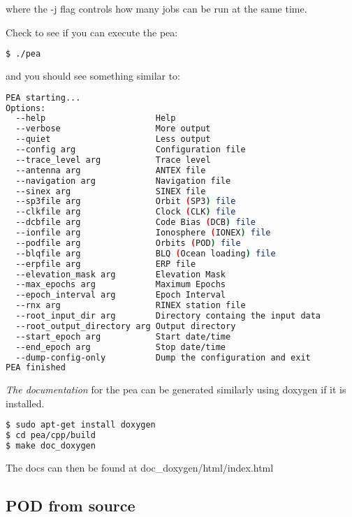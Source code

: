 where the -j flag controls how many jobs can be run at the same time.

Check to see if you can execute the pea:
\begin{lstlisting}[language=bash]
$ ./pea    
\end{lstlisting}

and you should see something similar to:
\begin{lstlisting}[language=bash]
PEA starting...
Options:
  --help                      Help
  --verbose                   More output
  --quiet                     Less output
  --config arg                Configuration file
  --trace_level arg           Trace level
  --antenna arg               ANTEX file
  --navigation arg            Navigation file
  --sinex arg                 SINEX file
  --sp3file arg               Orbit (SP3) file
  --clkfile arg               Clock (CLK) file
  --dcbfile arg               Code Bias (DCB) file
  --ionfile arg               Ionosphere (IONEX) file
  --podfile arg               Orbits (POD) file
  --blqfile arg               BLQ (Ocean loading) file
  --erpfile arg               ERP file
  --elevation_mask arg        Elevation Mask
  --max_epochs arg            Maximum Epochs
  --epoch_interval arg        Epoch Interval
  --rnx arg                   RINEX station file
  --root_input_dir arg        Directory containg the input data
  --root_output_directory arg Output directory
  --start_epoch arg           Start date/time
  --end_epoch arg             Stop date/time
  --dump-config-only          Dump the configuration and exit
PEA finished
\end{lstlisting}

\textit{The documentation} for the pea can be generated similarly using doxygen if it is installed.

\begin{lstlisting}[language=bash]
$ sudo apt-get install doxygen
$ cd pea/cpp/build
$ make doc_doxygen
\end{lstlisting}
The docs can then be found at doc\_doxygen/html/index.html

\subsection{POD from source}



